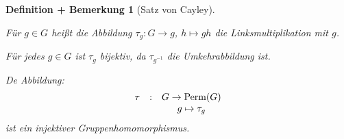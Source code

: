 \documentclass[a4paper,10pt,german]{scrbook}
\theoremstyle{saetze}
\theoremstyle{definitionen}
\newtheorem{DefBem}[Def]{Definition + Bemerkung}
\begin{document}
\begin{DefBem}[Satz von Cayley]
\mbox{}
\begin{enum}
\item Für $g\in G$ heißt die Abbildung $\tau_g:G\to g$, $h \mapsto gh$ die \emph{Linksmultiplikation} mit $g$.

\item Für jedes $g\in G$ ist $\tau_g$ bijektiv, da $\tau_{g^{-1}}$ die Umkehrabbildung ist.

\item De Abbildung:
\[ \begin{array}{lcc}
    \tau    &   :   &   G \rightarrow \mbox{Perm}(G) \\
            &       &   g \mapsto \tau_g
    \end{array} \]
ist ein injektiver Gruppenhomomorphismus. 
\end{enum}
\end{DefBem}
\end{document}
